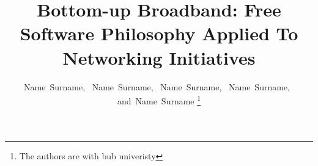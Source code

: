 \documentclass[journal]{IEEEtran}
\begin{document}
%
\title{Bottom-up Broadband: Free Software Philosophy Applied To Networking Initiatives}
%
%
%

\author{
	Name~Surname,~%
    Name~Surname,~%
    Name~Surname,~%
    Name~Surname,~%
    and~Name~Surname%
\thanks{The authors are with bub univeristy}
}


%
%



%
\end{document}
